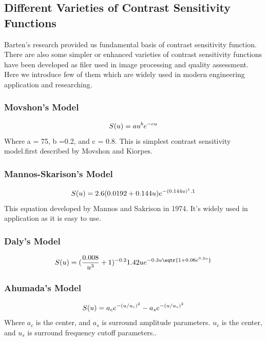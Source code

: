 \documentclass{article}
\begin{document}
\subsection{Different Varieties of Contrast Sensitivity Functions}
Barten's research provided us fundamental basis of contrast sensitivity function. There are also some  simpler or enhanced varieties of contrast sensitivity functions have been developed as filer used in image processing and quality assessment. Here we introduce few of them which are widely used in modern engineering application and researching.

\subsubsection{Movshon's Model}
\begin{equation}
    \centering
    \label{eq:mannos}
     S(u) = au^be^{-cu}
\end{equation}
Where a = 75, b =0.2, and c = 0.8. This is simplest contrast sensitivity model.first described by Movshon and Kiorpes.

\subsubsection{Mannos-Skarison's Model}
\begin{equation}
    \centering
    \label{eq:mannos}
     S(u) = 2.6(0.0192+0.144u)e^{-(0.144u)^1.1}
\end{equation}
This equation developed by Mannos and Sakrison in 1974. It's widely used in application as it is easy to use.

\subsubsection{Daly's Model}
\begin{equation}
    \centering
    \label{eq:daly}
     S(u) = (\frac{0.008}{u^3}+1)^{-0.2}1.42ue^{-0.3u\sqtr{1+0.06e^{0.3u}}}
\end{equation}

\subsubsection{Ahumada's Model}
\begin{equation}
    \centering
    \label{eq:ahumada}
     S(u) = a_ce^{-(u/u_c)^2}-a_se^{-(u/u_s)^2}
\end{equation}
Where $a_c$ is the center, and $a_s$ is surround amplitude parameters. $u_c$ is the center, and $u_s$ is surround frequency cutoff parameters..  
\end{document}

